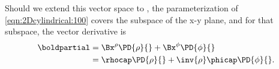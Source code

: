 Should we extend this vector space to , the parameterization of \cref{eqn:2Dcylindrical:100} covers the subspace of the x-y plane, and for that subspace, the vector derivative is
\begin{equation}\label{eqn:2Dcylindrical:601}
\begin{aligned}
\boldpartial
&=
\Bx^\rho \PD{\rho}{}
+ \Bx^\phi \PD{\phi}{} \\
&=
\rhocap \PD{\rho}{}
+\inv{\rho} \phicap \PD{\phi}{}.
\end{aligned}
\end{equation}

